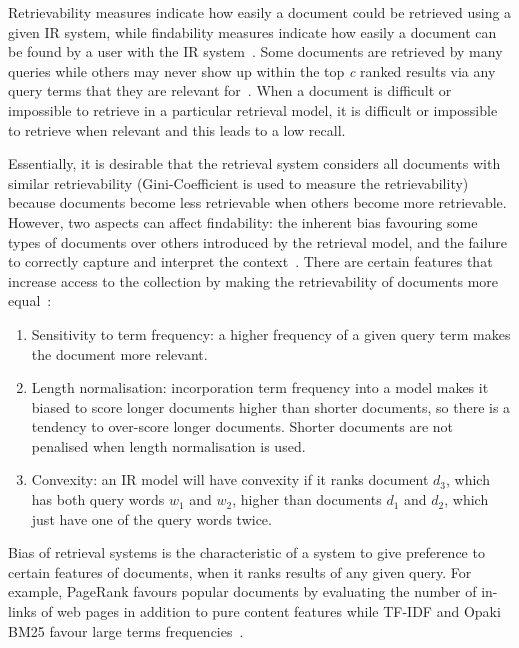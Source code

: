 Retrievability measures indicate how easily a document could be retrieved using a given IR system, while findability measures indicate how easily a document can be found by a user with the IR system~\citep{azzopardi2008retrievability}. Some documents are retrieved by many queries while others may never show up within the top \textit{c} ranked results via any query terms that they are relevant for~\citep{lupu2013patent}. When a document is difficult or impossible to retrieve in a particular retrieval model, it is difficult or impossible to retrieve when relevant and this leads to a low recall. 

Essentially, it is desirable that the retrieval system considers all documents with similar retrievability (Gini-Coefficient is used to measure the retrievability) because documents become less retrievable when others become more retrievable. However, two aspects can affect findability: the inherent bias favouring some types of documents over others introduced by the retrieval model, and the failure to correctly capture and interpret the context~\citep{bashir2009improving, bashir2011relationship}. There are certain features that increase access to the collection by making the retrievability of documents more equal~\citep{bache2010improving}:
\begin{enumerate}
\item Sensitivity to term frequency: a higher frequency of a given query term makes the document more relevant.
\item Length normalisation: incorporation term frequency into a model makes it biased to score longer documents higher than shorter documents, so there is a tendency to over-score longer documents. Shorter documents are not penalised when length normalisation is used.
\item Convexity: an IR model will have convexity if it ranks document $ d_{3} $, which has both query words $ w_{1} $ and $ w_{2} $, higher than documents $ d_{1} $ and $ d_{2} $, which just have one of the query words twice. 
\end{enumerate}
Bias of retrieval systems is the characteristic of a system to give preference to certain features of documents, when it ranks results of any given query. For example, PageRank favours popular documents by evaluating the number of in-links of web pages in addition to pure content features while TF-IDF and Opaki BM25 favour large terms frequencies~\citep{bashir2011relationship}.
